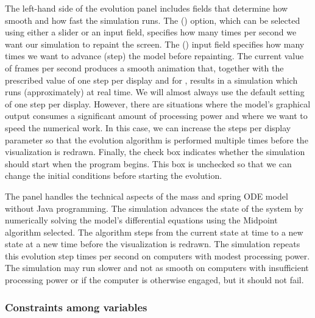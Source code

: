 The left-hand side of the evolution panel includes fields that determine how smooth and how fast the simulation runs.
The  () option, which can be selected using either a slider or an input field, specifies how many times per second we want our simulation to repaint the screen. The  () input field
specifies how many times we want to advance (step) the model before repainting. The current value of  frames per second produces a smooth animation that, together with the prescribed value of one step per display and  for
, results in a simulation which runs (approximately) at real time. We will almost always use the default
setting of one step per display. However, there are situations where the model's graphical output consumes a
significant amount of processing power and where we want to speed the numerical work. In this case, we can increase the
steps per display parameter so that the evolution algorithm is performed multiple times before the visualization is redrawn.
Finally, the  check box indicates whether the simulation should start when the program begins. This box
is unchecked so that we can change the initial conditions before starting the evolution.

The  panel handles the technical aspects of the mass and spring ODE model without Java programming.  The
simulation advances the state of the system by numerically solving the model's differential equations using the
Midpoint algorithm selected. The algorithm steps from the current state at time  to a new state at a new time
 before the visualization is redrawn. The simulation repeats this evolution step  times per second
on computers with modest processing power. The simulation may run slower and not as smooth on computers with
insufficient processing power or if the computer is otherwise engaged, but it should not fail.

\subsubsection{Constraints among variables}\label{section:02InspectingConstraints}

